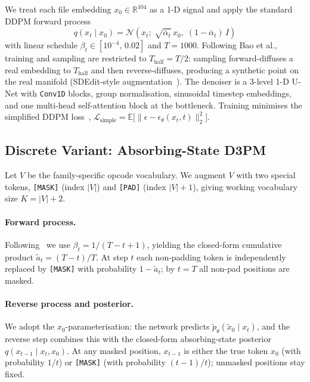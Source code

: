\documentclass[runningheads]{llncs}
\newcommand{\code}[1]{\texttt{#1}}
\begin{document}
We treat each file embedding $x_0 \in \mathbb{R}^{104}$ as a 1-D signal and
apply the standard DDPM forward process
\begin{equation}
q(x_t \mid x_0) = \mathcal{N}\!\left(x_t;\;\sqrt{\bar{\alpha}_t}\,x_0,\;
                                       (1-\bar{\alpha}_t)\,I\right)
\end{equation}
with linear schedule $\beta_t \in [10^{-4},\, 0.02]$ and $T=1000$. Following
Bao et al., training and sampling are restricted to $T_{\text{half}}=T/2$:
sampling forward-diffuses a real embedding to $T_{\text{half}}$ and then
reverse-diffuses, producing a synthetic point on the real manifold
(SDEdit-style augmentation~\cite{meng2022sdedit}). The denoiser is a 3-level
1-D U-Net with \code{Conv1D} blocks, group normalisation, sinusoidal timestep
embeddings, and one multi-head self-attention block at the bottleneck.
Training minimises the simplified DDPM loss~\cite{ho2020ddpm},
$\mathcal{L}_{\text{simple}} = \mathbb{E}\big[\|\epsilon - \epsilon_\theta(x_t, t)\|_2^2\big]$.

\subsection{Discrete Variant: Absorbing-State D3PM}
\label{sec:method-d3pm}

Let $V$ be the family-specific opcode vocabulary. We augment $V$ with two
special tokens, \texttt{[MASK]} (index $|V|$) and \texttt{[PAD]} (index
$|V|+1$), giving working vocabulary size $K = |V| + 2$.

\paragraph{Forward process.}
Following~\cite{austin2021d3pm} we use $\beta_t = 1/(T-t+1)$, yielding the
closed-form cumulative product $\tilde{a}_t = (T-t)/T$. At step $t$ each
non-padding token is independently replaced by \texttt{[MASK]} with probability
$1-\tilde{a}_t$; by $t=T$ all non-pad positions are masked.

\paragraph{Reverse process and posterior.}
We adopt the $x_0$-parameterisation: the network predicts
$\tilde{p}_\theta(\tilde{x}_0 \mid x_t)$, and the reverse step combines this
with the closed-form absorbing-state posterior $q(x_{t-1} \mid x_t, x_0)$.
At any masked position, $x_{t-1}$ is either the true token $x_0$ (with
probability $1/t$) or \texttt{[MASK]} (with probability $(t-1)/t$); unmasked
positions stay fixed.
\end{document}
